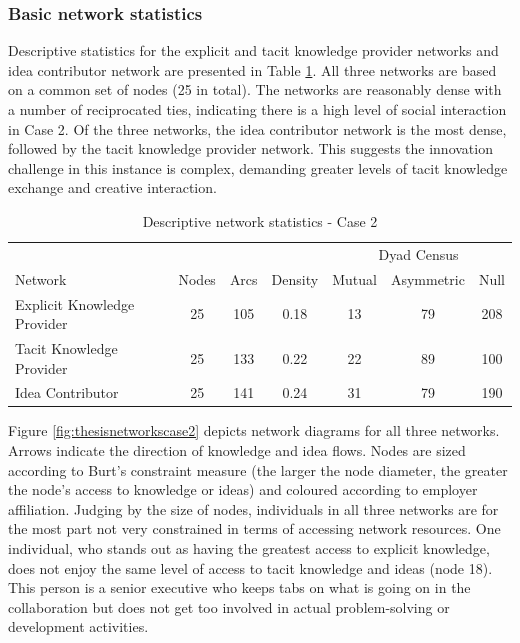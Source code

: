 \subsubsection{Basic network statistics}

Descriptive statistics for the explicit and tacit knowledge provider networks and idea contributor network are presented in Table \ref{ds_c2}. All three networks are based on a common set of nodes (25 in total). The networks are reasonably dense with a number of reciprocated ties, indicating there is a high level of social interaction in Case 2. Of the three networks, the idea contributor network is the most dense, followed by the tacit knowledge provider network. This suggests the innovation challenge in this instance is complex, demanding greater levels of tacit knowledge exchange and creative interaction.\medskip

\begin{table}[]
	\small
	\centering
	\caption{Descriptive network statistics - Case 2}
	\label{ds_c2}
	\begin{tabular}{@{}lcccccc@{}}
		\toprule
		& \multicolumn{1}{l}{} & \multicolumn{1}{l}{} & \multicolumn{1}{l}{} & \multicolumn{3}{c}{Dyad Census}	\\ \cline{5-7}
		Network						& Nodes			& Arcs			& Density	& Mutual		& Asymmetric	& Null		\\ \midrule
		Explicit Knowledge Provider & 25			& 105			& 0.18		& 13			& 79			& 208		\\
		Tacit Knowledge Provider    & 25			& 133			& 0.22		& 22			& 89			& 100		\\
		Idea Contributor            & 25			& 141			& 0.24		& 31			& 79			& 190		\\ \bottomrule
	\end{tabular}
\end{table}

Figure \ref{fig:thesisnetworkscase2} depicts network diagrams for all three networks. Arrows indicate the direction of knowledge and idea flows. Nodes are sized according to Burt's constraint measure (the larger the node diameter, the greater the node's access to knowledge or ideas) and coloured according to employer affiliation. Judging by the size of nodes, individuals in all three networks are for the most part not very constrained in terms of accessing network resources. One individual, who stands out as having the greatest access to explicit knowledge, does not enjoy the same level of access to tacit knowledge and ideas (node 18). This person is a senior executive who keeps tabs on what is going on in the collaboration but does not get too involved in actual problem-solving or development activities.\medskip 

